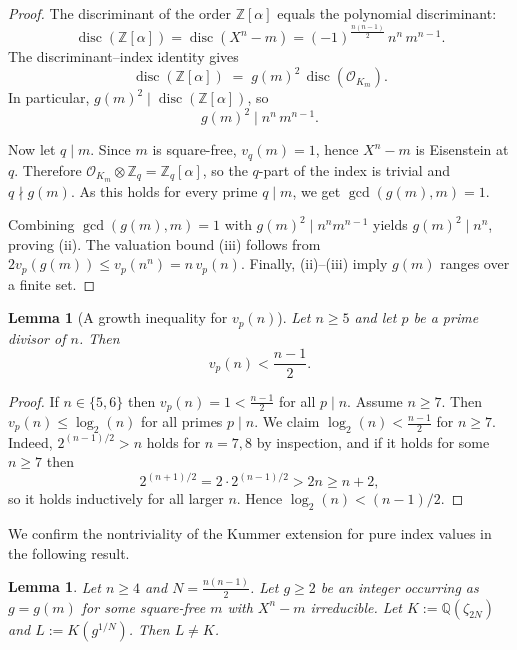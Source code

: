 \documentclass[11pt,letterpaper]{amsart}
\newcommand{\Z}{\mathbb{Z}}
\newcommand{\Q}{\mathbb{Q}}
\newcommand{\Ocal}{\mathcal{O}}
\newcommand{\disc}{\operatorname{disc}}
\theoremstyle{plain}
\newtheorem{lemma}[theorem]{Lemma}
\theoremstyle{definition}
\theoremstyle{remark}
\theoremstyle{plain}
\begin{document}
\begin{proof}
The discriminant of the order $\Z[\alpha]$ equals the polynomial discriminant:
\[
\disc(\Z[\alpha])=\disc(X^n-m)=(-1)^{\frac{n(n-1)}2}\,n^n\,m^{n-1}.
\]
The discriminant--index identity gives
\[
\disc(\Z[\alpha]) \;=\; g(m)^2\,\disc(\Ocal_{K_m}).
\]
In particular, $g(m)^2\mid \disc(\Z[\alpha])$, so
\[
g(m)^2 \mid n^n\,m^{n-1}.
\]

Now let $q\mid m$. Since $m$ is square-free, $v_q(m)=1$, hence $X^n-m$ is Eisenstein at $q$.
Therefore $\Ocal_{K_m}\otimes\Z_q=\Z_q[\alpha]$, so the $q$-part of the index is trivial and $q\nmid g(m)$.
As this holds for every prime $q\mid m$, we get $\gcd(g(m),m)=1$.

Combining $\gcd(g(m),m)=1$ with $g(m)^2\mid n^n m^{n-1}$ yields $g(m)^2\mid n^n$, proving (ii).
The valuation bound (iii) follows from $2v_p(g(m))\le v_p(n^n)=n\,v_p(n)$.
Finally, (ii)--(iii) imply $g(m)$ ranges over a finite set.
\end{proof}

\begin{lemma}[A growth inequality for $v_p(n)$]
\label{lem:vp-ineq}
Let $n\ge 5$ and let $p$ be a prime divisor of $n$. Then
\[
v_p(n)<\frac{n-1}{2}.
\]
\end{lemma}

\begin{proof}
If $n\in\{5,6\}$ then $v_p(n)=1<\frac{n-1}{2}$ for all $p\mid n$.
Assume $n\ge 7$. Then $v_p(n)\le \log_2(n)$ for all primes $p\mid n$.
We claim $\log_2(n)<\frac{n-1}{2}$ for $n\ge 7$.
Indeed, $2^{(n-1)/2}>n$ holds for $n=7,8$ by inspection, and if it holds for some $n\ge 7$ then
\[
2^{(n+1)/2}=2\cdot 2^{(n-1)/2}>2n\ge n+2,
\]
so it holds inductively for all larger $n$. Hence $\log_2(n)<(n-1)/2$.
\end{proof}

We confirm the nontriviality of the Kummer extension for pure index values in the following result.
\begin{lemma}
\label{lem:kummer-nontrivial}
Let $n\ge 4$ and $N=\frac{n(n-1)}2$.
Let $g\ge 2$ be an integer occurring as $g=g(m)$ for some square-free $m$ with $X^n-m$ irreducible.
Let $K:=\Q(\zeta_{2N})$ and $L:=K(g^{1/N})$.
Then $L\neq K$.
\end{lemma}
\end{document}
